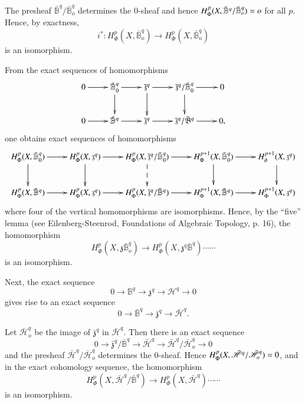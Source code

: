 The presheaf $\bar{\mathbb{B}}^q / \bar{\mathbb{B}}^q_o$ determines
the 0-sheaf and hence $H^{p}_{\Phi}(X,\break\bar{\mathbb{B}}^q /
\bar{\mathbb{B}}^q_o) =o $ for all $p$. Hence, by exactness, 
$$
i^* : H^{p}_{\Phi}(X,\bar{\mathbb{B}}^q_o) \to
H^{p}_{\Phi}(X,\bar{\mathbb{B}}^q_o) 
$$
is an isomorphism. 

From the exact sequences of homomorphisms  
\[
\xymatrix{
0 \ar[r] & \bar{\mathbb{B}}^q_0 \ar[r] \ar[d] & \bar{\mathfrak{z}}^q
\ar[r] \ar[d] & \bar{\mathfrak{z}}^q/\bar{\mathbb{B}}^q_0 \ar[r]\ar[d]
& 0\\
0 \ar[r] & \bar{\mathbb{B}}^q \ar[r] & \bar{\mathfrak{z}}^q \ar[r] &
\bar{\mathfrak{z}}^q / \bar{\mathfrak{B}}^q \ar[r] & 0,
}
\]
one obtains exact sequences of homomorphisms
{\fontsize{8}{10}\selectfont
\[
\xymatrix{
H^p_{\Phi} (X,\bar{\mathbb{B}}^q_0) \ar[r] \ar[d] &
  H^p_{\Phi}(X,\mathfrak{z}^q) \ar[r]\ar[d] & H^p_{\Phi}
  (X,\bar{\mathfrak{z}}^q/\bar{\mathbb{B}}^q_0) \ar[r] \ar@{-->}[d]
  & H^{p+1}_{\Phi} (X,\bar{\mathbb{B}}^q_0) \ar[r]\ar[d] &
  H^{p+1}_{\phi} (X,\mathfrak{z}^q)\ar[d]\\
H^p_{\Phi}(X,\bar{\mathbb{B}}^q) \ar[r] & H^p_{\Phi}(X,\mathfrak{z}^q)
\ar[r] & H^p_{\Phi} (X,\bar{\mathfrak{z}}^q/\bar{\mathbb{B}}^q) \ar[r] &
H^{p+1}_{\Phi} (X,\bar{\mathbb{B}}^q) \ar[r] &
H^{p+1}_{\Phi}(X,\mathfrak{z}^q)  
}
\]}\relax
where four of the vertical homomorphisms are isomorphisms. Hence, by
the ``five'' lemma (see Eilenberg-Steenrod, Foundations of Algebraic
Topology, p. 16), the homomorphism 
\begin{equation*}
H^{p}_{\Phi}(X, \mathfrak{z} \bar{\mathbb{B}}^q_o) \to H^{p}_{\Phi}(X,
\mathfrak{z}^q \bar{\mathbb{B}}^q) \cdots \cdots \tag{2} \label{chap22:eq2}
\end{equation*}\pageoriginale
is an isomorphism.

Next, the exact sequence 
$$
0 \to \mathbb{B}^q \to \mathfrak{z}^q \to \mathscr{H}^q \to 0 
$$
gives rise to an exact sequence  
$$
0 \to \bar{\mathbb{B}}^q \to \bar{\mathfrak{z}}^q \to
\bar{\mathscr{H}}^q . 
$$

Let $\bar{\mathscr{H}}^q_o$ be the image of $\bar{\mathfrak{z}}^q $ in
$\bar{\mathscr{H}}^q $. Then there is an exact sequence  
$$
0 \to \bar{\mathfrak{z}}^q / \bar{\mathbb{B}}^q \to
\bar{\mathscr{H}}^q \to \bar{\mathscr{H}}^q /\bar{\mathscr{H}}^q_o \to
0 
$$
and the presheaf $\bar{\mathscr{H}}^q  / \bar{\mathscr{H}}^q_o$
determines the 0-sheaf. Hence $H^p_{\Phi}(X,\break\bar{\mathscr{H}}^q  /
\bar{\mathscr{H}}^q_o) =0$, and in the exact cohomology sequence, the
homomorphism  
\begin{equation*}
H^p_{\Phi}(X,\bar{\mathscr{H}}^q / \bar{\mathbb{B}}^q) \to 
H^p_{\Phi}(X,\bar{\mathscr{H}}^q) \cdots \cdots \tag{3} \label{chap22:eq3}
\end{equation*}
is an isomorphism.

